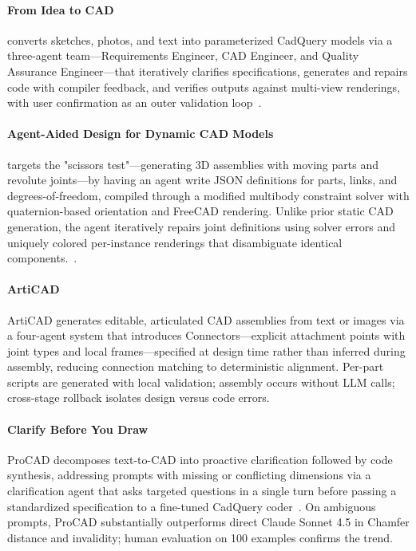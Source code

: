 \paragraph{From Idea to CAD}
converts sketches, photos, and text into parameterized CadQuery models via a three-agent team—Requirements Engineer, CAD Engineer, and Quality Assurance Engineer—that iteratively clarifies specifications, generates and repairs code with compiler feedback, and verifies outputs against multi-view renderings, with user confirmation as an outer validation loop~\cite{ocker2025ideatocad}.

\paragraph{Agent-Aided Design for Dynamic CAD Models} targets the "scissors test"—generating 3D assemblies with moving parts and revolute joints—by having an agent write JSON definitions for parts, links, and degrees-of-freedom, compiled through a modified multibody constraint solver with quaternion-based orientation and FreeCAD rendering. Unlike prior static CAD generation, the agent iteratively repairs joint definitions using solver errors and uniquely colored per-instance renderings that disambiguate identical components.~\cite{avg260415184}.

\paragraph{ArtiCAD}
ArtiCAD generates editable, articulated CAD assemblies from text or images via a four-agent system that introduces Connectors—explicit attachment points with joint types and local frames—specified at design time rather than inferred during assembly, reducing connection matching to deterministic alignment. Per-part scripts are generated with local validation; assembly occurs without LLM calls; cross-stage rollback isolates design versus code errors.~\cite{avg260410992}

\paragraph{Clarify Before You Draw}
ProCAD decomposes text-to-CAD into proactive clarification followed by code synthesis, addressing prompts with missing or conflicting dimensions via a clarification agent that asks targeted questions in a single turn before passing a standardized specification to a fine-tuned CadQuery coder~\cite{avg260203045}. On ambiguous prompts, ProCAD substantially outperforms direct Claude Sonnet 4.5 in Chamfer distance and invalidity; human evaluation on 100 examples confirms the trend. 


